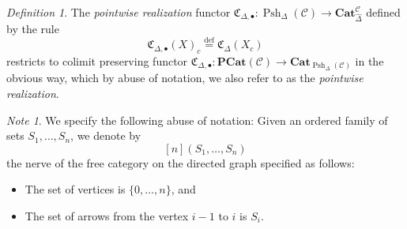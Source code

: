 \documentclass{amsart}
\numberwithin{equation}{section}
\theoremstyle{plain}   %
\theoremstyle{remark}
\newtheorem{note}[subsection]{Note}
\newtheorem{defn}[subsection]{Definition}
\theoremstyle{plain}
\newcommand{\Cat}{\ensuremath{\mathbf{Cat}}}
\newcommand{\psh}[1]{\ensuremath{\widehat{#1}}}
\newcommand{\C}{\ensuremath{\mathcal{C}}}
\newcommand{\defeq}{\overset{\mathrm{def}}=}
\newcommand{\spsh}{\ensuremath{\operatorname{Psh}_\Delta(\mathcal{C})}}
\begin{document}
\begin{defn}\label{pointwisedefn}
	The \emph{pointwise realization} functor \(\mathfrak{C}_{\Delta,\bullet}: \spsh \to \Cat_{\psh{\Delta}}^\C\) defined by the rule 
	\[
		\mathfrak{C}_{\Delta,\bullet}(X)_c \defeq \mathfrak{C}_{\Delta}(X_c)
	\]
		restricts to colimit preserving functor \(\mathfrak{C}_{\Delta,\bullet}: \mathbf{PCat}(\C) \to \Cat_{\spsh}\) in the obvious way, which by abuse of notation, we also refer to as the \emph{pointwise realization}.
\end{defn}

\begin{note}
	We specify the following abuse of notation: Given an ordered family of sets \(S_1,\dots, S_n\), we denote by
	\[
		[n](S_1,\dots,S_n)
	\]
	the nerve of the free category on the directed graph specified as follows:
	\begin{itemize}
		\item The set of vertices is \(\{0,\dots,n\}\), and
		\item The set of arrows from the vertex \(i-1\) to \(i\) is \(S_i\).
	\end{itemize}
\end{note}
\end{document}
